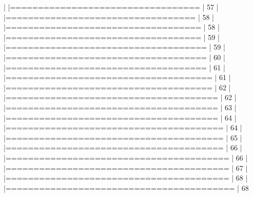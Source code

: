 \documentclass[article,nojss]{jss} %
\begin{document}
\begin{Schunk}
\begin{Soutput}
  |                                                                  
  |==================================                          |  57%
  |                                                                  
  |==================================                          |  58%
  |                                                                  
  |===================================                         |  58%
  |                                                                  
  |===================================                         |  59%
  |                                                                  
  |====================================                        |  59%
  |                                                                  
  |====================================                        |  60%
  |                                                                  
  |====================================                        |  61%
  |                                                                  
  |=====================================                       |  61%
  |                                                                  
  |=====================================                       |  62%
  |                                                                  
  |======================================                      |  62%
  |                                                                  
  |======================================                      |  63%
  |                                                                  
  |======================================                      |  64%
  |                                                                  
  |=======================================                     |  64%
  |                                                                  
  |=======================================                     |  65%
  |                                                                  
  |=======================================                     |  66%
  |                                                                  
  |========================================                    |  66%
  |                                                                  
  |========================================                    |  67%
  |                                                                  
  |========================================                    |  68%
  |                                                                  
  |=========================================                   |  68%

\end{Soutput}
\end{Schunk}
\end{document}
